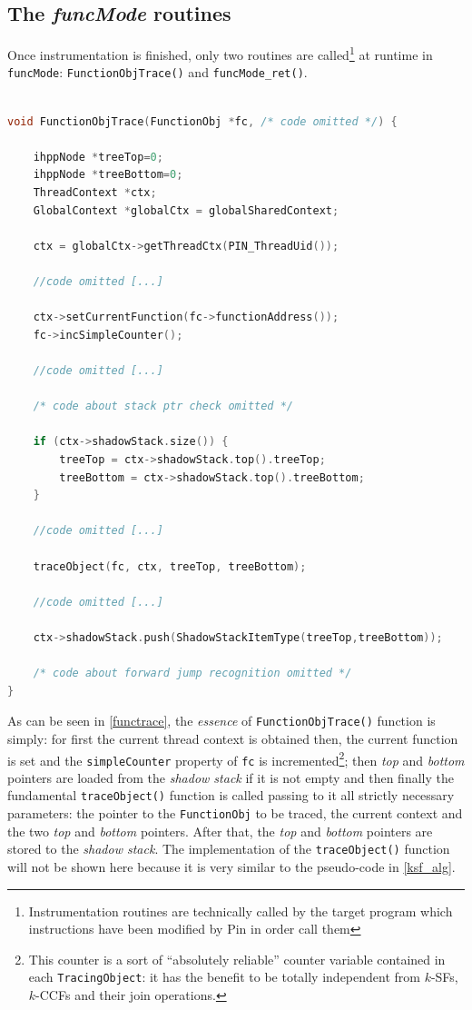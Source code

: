 \documentclass[a4paper,10pt]{report}
\begin{document}
\subsection{The \emph{funcMode} routines}

Once instrumentation is finished, only two routines are 
called\footnote{Instrumentation routines are technically called by the target program
which instructions have been modified by Pin in order call them}
at runtime in \verb|funcMode|: \verb|FunctionObjTrace()| and \verb|funcMode_ret()|.

\begin{lstlisting}[language=C++, 
	caption={a fragment of \texttt{FunctionObjTrace()} routine}, 
	label=functrace, frame=leftline]

void FunctionObjTrace(FunctionObj *fc, /* code omitted */) {

	ihppNode *treeTop=0;
	ihppNode *treeBottom=0;	
	ThreadContext *ctx;
	GlobalContext *globalCtx = globalSharedContext;

	ctx = globalCtx->getThreadCtx(PIN_ThreadUid());

	//code omitted [...]

	ctx->setCurrentFunction(fc->functionAddress());
	fc->incSimpleCounter();

	//code omitted [...]

	/* code about stack ptr check omitted */

	if (ctx->shadowStack.size()) {
		treeTop = ctx->shadowStack.top().treeTop; 
		treeBottom = ctx->shadowStack.top().treeBottom;
	} 

	//code omitted [...]

	traceObject(fc, ctx, treeTop, treeBottom);

	//code omitted [...]

	ctx->shadowStack.push(ShadowStackItemType(treeTop,treeBottom));

	/* code about forward jump recognition omitted */
}

\end{lstlisting}

\noindent
As can be seen in \cref{functrace}, the \emph{essence} of \verb|FunctionObjTrace()|
function is simply: for first the current thread context is obtained then, 
the current function is set and the \verb|simpleCounter| property of \verb|fc|
is incremented\footnote{This counter is 
a sort of ``absolutely reliable'' counter variable contained in each \texttt{TracingObject}:
it has the benefit to be totally independent from $k$-SFs, $k$-CCFs and their join
operations.}; then \emph{top} and \emph{bottom} pointers are loaded from the 
\emph{shadow stack} if it is not empty and then finally the fundamental \verb|traceObject()|
function is called passing to it all strictly necessary parameters: 
the pointer to the \verb|FunctionObj| to be traced, the current context and the
two \emph{top} and \emph{bottom} pointers. After that, the \emph{top} and \emph{bottom} pointers are stored to the \emph{shadow stack}. 
The implementation of the \verb|traceObject()| function will not be shown here
because it is very similar to the pseudo-code in \cref{ksf_alg}.
\end{document}
